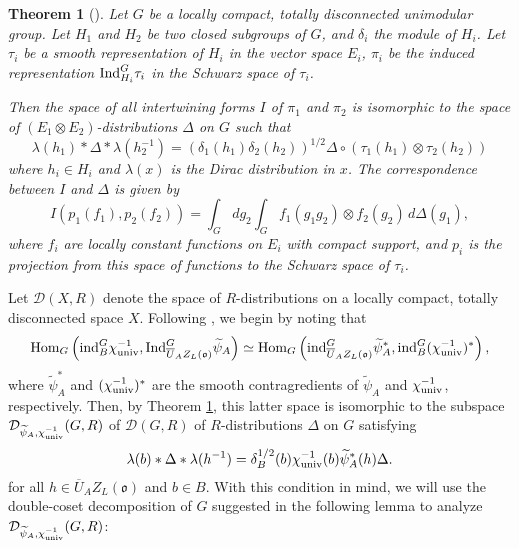 \documentclass[11pt,letterpaper]{article}
\newcommand{\calD}{\mathcal{D}}
\newcommand{\goth}{\mathfrak}
\newcommand{\calHom}{\textup{Hom}}
\newcommand{\Ind}{\textup{Ind}}
\newcommand{\ind}{\textup{ind}}
\newtheorem{Theorem}{Theorem}[section]
\theoremstyle{remark}
\numberwithin{equation}{section}
\begin{document}
\begin{Theorem}[\cite{Bru}]\label{thm:mackey}
Let $G$ be a locally compact, totally disconnected unimodular group. Let $H_1$ and $H_2$ be two closed subgroups of $G$, and $\delta_i$ the module of $H_i$. Let $\tau_i$ be a smooth representation of $H_i$ in the vector space $E_i$, $\pi_i$ be the induced representation $\Ind_{H_i}^G \tau_i$ in the Schwarz space of $\tau_i$.

Then the space of all intertwining forms $I$ of $\pi_1$ and $\pi_2$ is isomorphic to the space of $(E_1 \otimes E_2)$-distributions $\Delta$ on $G$ such that \begin{equation} \lambda(h_1) \ast \Delta \ast \lambda(h_2^{-1}) = (\delta_1(h_1)\delta_2(h_2))^{1/2}\Delta \circ(\tau_1(h_1)\otimes \tau_2(h_2))\end{equation} where $h_i \in H_i$ and $\lambda(x)$ is the Dirac distribution in $x$. The correspondence between $I$ and $\Delta$ is given by \begin{equation}\label{eqn:intertwiningform}I(p_1(f_1), p_2(f_2)) = \int_G dg_2\int_G f_1(g_1g_2)\otimes f_2(g_2)\,d\Delta(g_1),\end{equation} where $f_i$ are locally constant functions on $E_i$ with compact support, and $p_i$ is the projection from this space of functions to the Schwarz space of $\tau_i$.
\end{Theorem}

Let $\calD(X,R)$ denote the space of $R$-distributions on a locally compact, totally disconnected space $X$. Following \cite{FG}, we begin by noting that $$\calHom_G\left(\ind_B^G \chi_{\textup{univ}}^{-1}, \Ind_{\overline{U}_AZ_L(\goth{o})}^G \widetilde{\psi}_A\right) \simeq \calHom_G\left(\ind_{\overline{U}_AZ_L(\goth{o})}^G \widetilde{\psi}_A^{\ast}, \ind_B^G (\chi_{\textup{univ}}^{-1})^{\ast}\right),$$ where $\widetilde{\psi}_A^{\ast}$ and $(\chi_{\textup{univ}}^{-1})^{\ast}$ are the smooth contragredients of $\widetilde{\psi}_A$ and $\chi_{\textup{univ}}^{-1}$, respectively. Then, by Theorem \ref{thm:mackey}, this latter space is isomorphic to the subspace $\calD_{\widetilde{\psi}_A,\chi_{\textup{univ}}^{-1}}(G,R)$ of $\calD(G,R)$ of $R$-distributions $\Delta$ on $G$ satisfying \begin{equation}\label{mackey}\lambda(b) \ast \Delta \ast \lambda(h^{-1}) = \delta_B^{1/2}(b)\chi_{\textup{univ}}^{-1}(b)\widetilde{\psi}_A^{\ast}(h)\Delta.\end{equation} for all $h \in \overline{U}_AZ_L(\goth{o})$ and $b \in B$. With this condition in mind, we will use the double-coset decomposition of $G$ suggested in the following lemma to analyze $\calD_{\widetilde{\psi}_A,\chi_{\textup{univ}}^{-1}}(G,R)$:
\end{document}
